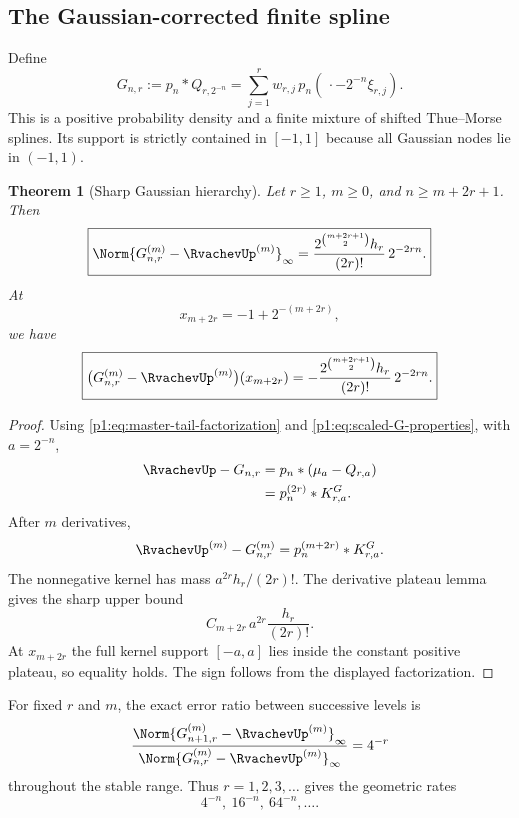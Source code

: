 \documentclass[11pt]{article}
\numberwithin{equation}{section}
\newtheorem{theorem}{Theorem}[section]
\theoremstyle{definition}
\theoremstyle{remark}
\begin{document}
\subsection{The Gaussian-corrected finite spline}

Define
\begin{equation}
 G_{n,r}:=p_n*Q_{r,2^{-n}}
 =\sum_{j=1}^{r}w_{r,j}\,p_n(\,\cdot-2^{-n}\xi_{r,j}).
 \label{p1:eq:Gnr}
\end{equation}
This is a positive probability density and a finite mixture of shifted Thue--Morse splines.  Its support is strictly contained in $[-1,1]$ because all Gaussian nodes lie in $(-1,1)$.

\begin{theorem}[Sharp Gaussian hierarchy]
\label{p1:thm:gaussian-exact}
Let $r\ge1$, $m\ge0$, and $n\ge m+2r+1$.  Then
\begin{equation}
 \boxed{
 \Norm{G_{n,r}^{(m)}-\RvachevUp^{(m)}}_\infty
 =\frac{2^{\binom{m+2r+1}{2}}h_r}{(2r)!}\,2^{-2rn}.}
 \label{p1:eq:Gaussian-exact}
\end{equation}
At
\begin{equation}
 x_{m+2r}=-1+2^{-(m+2r)},
 \label{p1:eq:G-extremal}
\end{equation}
we have
\begin{equation}
 \boxed{
 \bigl(G_{n,r}^{(m)}-\RvachevUp^{(m)}\bigr)(x_{m+2r})
 =-\frac{2^{\binom{m+2r+1}{2}}h_r}{(2r)!}\,2^{-2rn}.}
 \label{p1:eq:G-signed}
\end{equation}
\end{theorem}

\begin{proof}
Using \eqref{p1:eq:master-tail-factorization} and \eqref{p1:eq:scaled-G-properties}, with $a=2^{-n}$,
\begin{align}
 \RvachevUp-G_{n,r}
 &=p_n*(\mu_a-Q_{r,a})\nonumber\\
 &=p_n^{(2r)}*K_{r,a}^G.
 \label{p1:eq:G-factorization}
\end{align}
After $m$ derivatives,
\[
 \RvachevUp^{(m)}-G_{n,r}^{(m)}
 =p_n^{(m+2r)}*K_{r,a}^G.
\]
The nonnegative kernel has mass $a^{2r}h_r/(2r)!$.  The derivative plateau lemma gives the sharp upper bound
\[
 C_{m+2r}\,a^{2r}\frac{h_r}{(2r)!}.
\]
At $x_{m+2r}$ the full kernel support $[-a,a]$ lies inside the constant positive plateau, so equality holds.  The sign follows from the displayed factorization.
\end{proof}

\begin{corollary}
For fixed $r$ and $m$, the exact error ratio between successive levels is
\begin{equation}
 \frac{\Norm{G_{n+1,r}^{(m)}-\RvachevUp^{(m)}}_\infty}
 {\Norm{G_{n,r}^{(m)}-\RvachevUp^{(m)}}_\infty}=4^{-r}
 \label{p1:eq:Gaussian-ratio}
\end{equation}
throughout the stable range.  Thus $r=1,2,3,\ldots$ gives the geometric rates
\[
 4^{-n},\ 16^{-n},\ 64^{-n},\ldots.
\]
\end{corollary}
\end{document}
